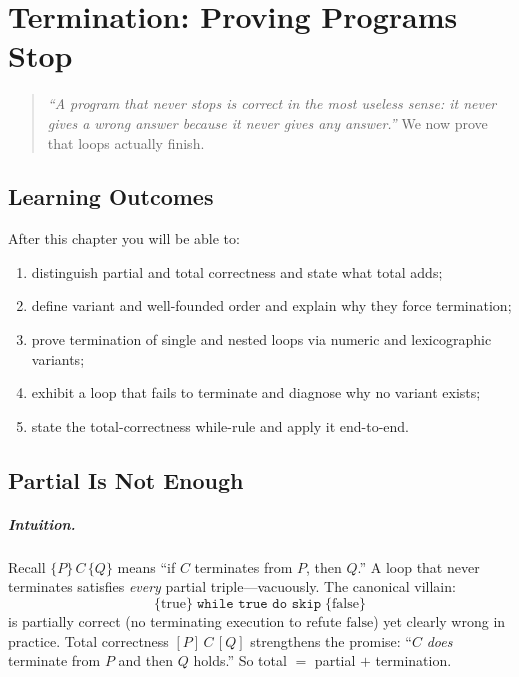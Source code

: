 \chapter{Termination: Proving Programs Stop}
\label{ch:termination}

\begin{quote}
\emph{``A program that never stops is correct in the most useless sense: it never gives a wrong answer because it never gives any answer.''} We now prove that loops actually finish.
\end{quote}

\noindent{}
\vspace{0.4em}

\section*{Learning Outcomes}
After this chapter you will be able to:
\begin{enumerate}[label=(L\arabic*)]
    \item distinguish partial and total correctness and state what total adds;
    \item define variant and well-founded order and explain why they force termination;
    \item prove termination of single and nested loops via numeric and lexicographic variants;
    \item exhibit a loop that fails to terminate and diagnose why no variant exists;
    \item state the total-correctness while-rule and apply it end-to-end.
\end{enumerate}

\section{Partial Is Not Enough}
\label{sec:partial-not-enough}
\paragraph{Intuition.} Recall $\{P\}\,C\,\{Q\}$ means ``if $C$ terminates from $P$, then $Q$.'' A loop that never terminates satisfies \emph{every} partial triple—vacuously. The canonical villain:
\[
\{\text{true}\}\;\texttt{while true do skip}\;\{\text{false}\}
\]
is partially correct (no terminating execution to refute $\text{false}$) yet clearly wrong in practice. Total correctness $[P]\,C\,[Q]$ strengthens the promise: ``$C$ \emph{does} terminate from $P$ and then $Q$ holds.'' So total $=$ partial $+$ termination.

